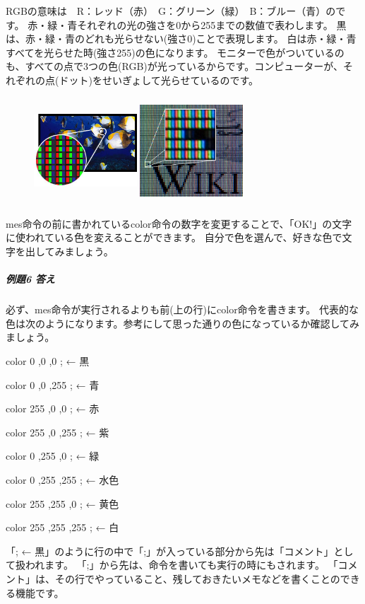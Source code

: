 RGBの意味は　R：レッド（赤）　G：グリーン（緑）　B：ブルー（青）のです。
赤・緑・青それぞれの光の強さを0から255までの数値で表わします。
黒は、赤・緑・青のどれも光らせない(強さ0)ことで表現します。
白は赤・緑・青すべてを光らせた時(強さ255)の色になります。
\clearpage
モニターで色がついているのも、すべての点で3つの色(RGB)が光っているからです。コンピューターが、それぞれの点(ドット)をせいぎょして光らせているのです。

\begin{figure}[H]
    \begin{center}
        \includegraphics[keepaspectratio,width=3.854cm,height=3.988cm]{text02-img/text02-img034.jpg}
        \includegraphics[keepaspectratio,width=3.854cm,height=3.988cm]{text02-img/text02-img035.jpg}
    \end{center}
\end{figure}

mes命令の前に書かれているcolor命令の数字を変更することで、「OK!」の文字に使われている色を変えることができます。
自分で色を選んで、好きな色で文字を出してみましょう。

\subparagraph*{例題6 答え}

必ず、mes命令が実行されるよりも前(上の行)にcolor命令を書きます。
代表的な色は次のようになります。参考にして思った通りの色になっているか確認してみましょう。

\begin{description}
    \item color 0 ,0 ,0 ; ← 黒 
    \item color 0 ,0 ,255 ; ← 青 
    \item color 255 ,0 ,0 ; ← 赤 
    \item color 255 ,0 ,255 ; ← 紫 
    \item color 0 ,255 ,0 ; ← 緑
    \item color 0 ,255 ,255 ; ← 水色
    \item color 255 ,255 ,0 ; ← 黄色
    \item color 255 ,255 ,255 ; ← 白
\end{description}

「; ← 黒」のように行の中で「;」が入っている部分から先は「コメント」として扱われます。
「;」から先は、命令を書いても実行の時にもされます。
「コメント」は、その行でやっていること、残しておきたいメモなどを書くことのできる機能です。

